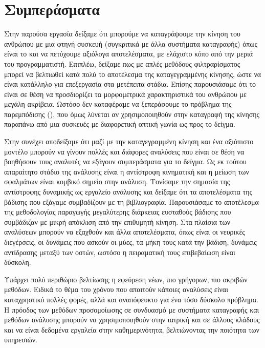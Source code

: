 \vfill

\section{Συμπεράσματα}

Στην παρούσα εργασία δείξαμε ότι μπορούμε να καταγράψουμε την κίνηση του ανθρώπου με μια φτηνή συσκευή (συγκριτικά με άλλα συστήματα καταγραφής) όπως είναι το  και να πετύχουμε αξιόλογα αποτελέσματα, με ελάχιστο κόπο από την μεριά του προγραμματιστή. Επιπλέω, δείξαμε πως με απλές μεθόδους φιλτραρίσματος μπορεί να βελτιωθεί κατά πολύ το αποτέλεσμα της καταγεγραμμένης κίνησης, ώστε να είναι κατάλληλο για επεξεργασία στα μετέπειτα στάδια. Επίσης παρουσιάσαμε ότι το  είναι σε θέση να προσδιορίζει τα μορφομετρικά χαρακτηριστικά του ανθρώπου με μεγάλη ακρίβεια. Ωστόσο δεν καταφέραμε να ξεπεράσουμε το πρόβλημα της παρεμπόδισης (), που όμως λύνεται αν χρησιμοποιηθούν στην καταγραφή της κίνησης παραπάνω από μια συσκευές με διαφορετική οπτική γωνία ως προς το δείγμα.

Στην συνέχει αποδείξαμε ότι μαζί με την καταγεγραμμένη κίνηση και ένα αξιόπιστο μοντέλο μπορούν να γίνουν πολλές και διάφορες αναλύσεις που είναι σε θέση να βοηθήσουν τους αναλυτές να εξάγουν συμπεράσματα για το δείγμα. Ως εκ τούτου απαραίτητο στάδιο της ανάλυσης είναι η αντίστροφη κινηματική και η μείωση των σφαλμάτων είναι κομβικό σημείο στην ανάλυση. Τονίσαμε την σημασία της αντίστροφης δυναμικής ως εργαλείο ανάλυσης και δείξαμε ότι τα αποτελέσματα της βάδισης που εξάγαμε συμβαδίζουν με τη βιβλιογραφία. Παρουσιάσαμε το αποτέλεσμα της μεθοδολογίας παραγωγής μεγαλύτερης διάρκειας ευσταθούς βάδισης που συμβάδιζαν με μικρή απόκλιση από την επιθυμητή κίνηση. Στα πλαίσια των αναλύσεων μπορούν να εξαχθούν και άλλα αποτελέσματα, όπως είναι οι νευρικές διεγέρσεις, οι δυνάμεις που ασκούν οι μύες, τα μήκη τους κατά την βάδιση, δυνάμεις αντίδρασης μεταξύ των οστών, ωστόσο η πειραματική τους επιβεβαίωση είναι δύσκολη.
 
 Υπάρχει πολύ περιθώριο βελτίωσης η εφεύρεση νέων, πιο γρήγορων, πιο ακριβών μεθόδων. Ειδικά το θέμα του χρόνου που απαιτούν κάποιες αναλύσεις είναι καταχρηστικό πολλές φορές, αλλά και αναπόφευκτο για ένα τόσο δύσκολο πρόβλημα. Η πρόοδος των μεθόδων προσομοίωσης σε συνδυασμό με συστήματα καταγραφής και μεθόδων ανάλυσης μπορούν να χρησιμοποιηθούν στην ιατρική και σε άλλους κλάδους και να είναι δεδομένα εργαλεία στην καθημερινότητα, βελτιώνοντας την ποιότητα των υπηρεσιών.
